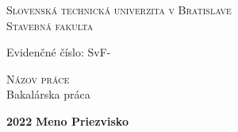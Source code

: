 
\begin{center}
	\textsc{\LARGE
		Slovenská technická univerzita v Bratislave\\
		\vspace{10pt}
		Stavebná fakulta}\\
	
	\begin{flushleft}
		Evidenčné číslo: SvF-
	\end{flushleft}
	\vfill
	
	\textsc{\LARGE
		Názov práce}\\ 
	\vspace{10pt}
	{\Large
		Bakalárska práca}
\end{center}

\vfill

{\Large
	\noindent \textbf{2022}
	\hfill \textbf{Meno Priezvisko} %
}

\
